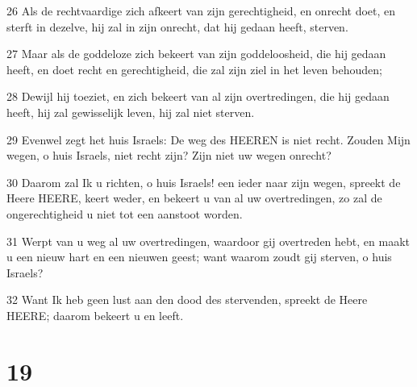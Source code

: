 \par 26 Als de rechtvaardige zich afkeert van zijn gerechtigheid, en onrecht doet, en sterft in dezelve, hij zal in zijn onrecht, dat hij gedaan heeft, sterven.
\par 27 Maar als de goddeloze zich bekeert van zijn goddeloosheid, die hij gedaan heeft, en doet recht en gerechtigheid, die zal zijn ziel in het leven behouden;
\par 28 Dewijl hij toeziet, en zich bekeert van al zijn overtredingen, die hij gedaan heeft, hij zal gewisselijk leven, hij zal niet sterven.
\par 29 Evenwel zegt het huis Israels: De weg des HEEREN is niet recht. Zouden Mijn wegen, o huis Israels, niet recht zijn? Zijn niet uw wegen onrecht?
\par 30 Daarom zal Ik u richten, o huis Israels! een ieder naar zijn wegen, spreekt de Heere HEERE, keert weder, en bekeert u van al uw overtredingen, zo zal de ongerechtigheid u niet tot een aanstoot worden.
\par 31 Werpt van u weg al uw overtredingen, waardoor gij overtreden hebt, en maakt u een nieuw hart en een nieuwen geest; want waarom zoudt gij sterven, o huis Israels?
\par 32 Want Ik heb geen lust aan den dood des stervenden, spreekt de Heere HEERE; daarom bekeert u en leeft.

\chapter{19}

